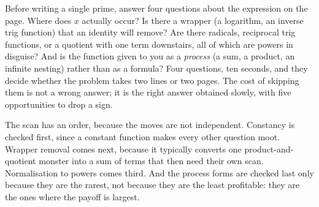 \begin{keynote}
Before writing a single prime, answer four questions about the expression on the page. Where does $x$ actually occur? Is there a wrapper (a logarithm, an inverse trig function) that an identity will remove? Are there radicals, reciprocal trig functions, or a quotient with one term downstairs, all of which are powers in disguise? And is the function given to you as a \emph{process} (a sum, a product, an infinite nesting) rather than as a formula? Four questions, ten seconds, and they decide whether the problem takes two lines or two pages. The cost of skipping them is not a wrong answer; it is the right answer obtained slowly, with five opportunities to drop a sign.
\end{keynote}

The scan has an order, because the moves are not independent. Constancy is checked first, since a constant function makes every other question moot. Wrapper removal comes next, because it typically converts one product-and-quotient monster into a sum of terms that then need their own scan. Normalisation to powers comes third. And the process forms are checked last only because they are the rarest, not because they are the least profitable: they are the ones where the payoff is largest.

\begin{center}
\end{center}

